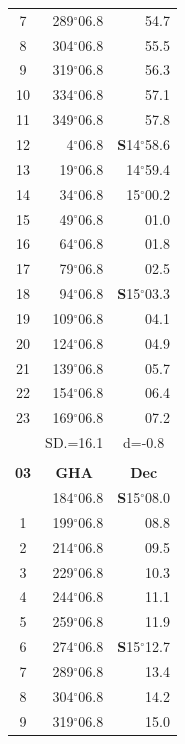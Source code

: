 \documentclass[10pt, a4paper]{report}
\begin{document}
\begin{scriptsize}
\begin{tabular*}{0.2\textwidth}[t]{@{\extracolsep{\fill}}|c|rr|}
7 & 289$^\circ$06.8 & 54.7\\
8 & 304$^\circ$06.8 & 55.5\\
9 & 319$^\circ$06.8 & \raisebox{0.24ex}{\boldmath$\cdot$~\boldmath$\cdot$~~}56.3\\
10 & 334$^\circ$06.8 & 57.1\\
11 & 349$^\circ$06.8 & 57.8\\[2Pt]
12 & 4$^\circ$06.8 & \textbf{S}14$^\circ$58.6\\
13 & 19$^\circ$06.8 & 14$^\circ$59.4\\
14 & 34$^\circ$06.8 & 15$^\circ$00.2\\
15 & 49$^\circ$06.8 & \raisebox{0.24ex}{\boldmath$\cdot$~\boldmath$\cdot$~~}01.0\\
16 & 64$^\circ$06.8 & 01.8\\
17 & 79$^\circ$06.8 & 02.5\\[2Pt]
18 & 94$^\circ$06.8 & \textbf{S}15$^\circ$03.3\\
19 & 109$^\circ$06.8 & 04.1\\
20 & 124$^\circ$06.8 & 04.9\\
21 & 139$^\circ$06.8 & \raisebox{0.24ex}{\boldmath$\cdot$~\boldmath$\cdot$~~}05.7\\
22 & 154$^\circ$06.8 & 06.4\\
23 & 169$^\circ$06.8 & 07.2\\
\hline
\rule{0pt}{2.4ex} & \multicolumn{1}{c}{SD.=16.1} & \multicolumn{1}{c|}{d=-0.8}\\
\hline
\multicolumn{1}{c}{}\\[-0.5ex]\hline
\multicolumn{1}{|c|}{\rule{0pt}{2.6ex}\textbf{03}} & \multicolumn{1}{c}{\textbf{GHA}} & \multicolumn{1}{c|}{\textbf{Dec}}\\
\hline\rule{0pt}{2.6ex}\noindent
0 & 184$^\circ$06.8 & \textbf{S}15$^\circ$08.0\\
1 & 199$^\circ$06.8 & 08.8\\
2 & 214$^\circ$06.8 & 09.5\\
3 & 229$^\circ$06.8 & \raisebox{0.24ex}{\boldmath$\cdot$~\boldmath$\cdot$~~}10.3\\
4 & 244$^\circ$06.8 & 11.1\\
5 & 259$^\circ$06.8 & 11.9\\[2Pt]
6 & 274$^\circ$06.8 & \textbf{S}15$^\circ$12.7\\
7 & 289$^\circ$06.8 & 13.4\\
8 & 304$^\circ$06.8 & 14.2\\
9 & 319$^\circ$06.8 & \raisebox{0.24ex}{\boldmath$\cdot$~\boldmath$\cdot$~~}15.0\\

\end{tabular*}
\end{scriptsize}
\end{document}
